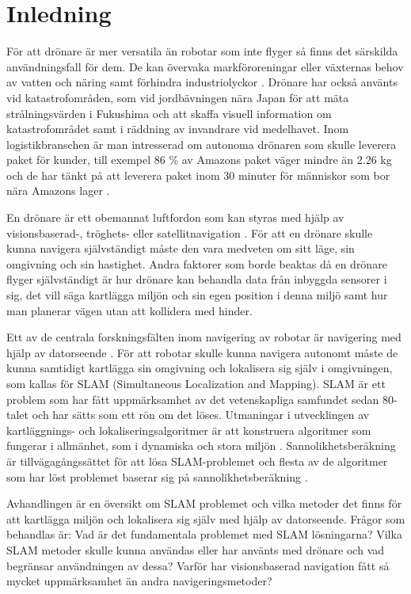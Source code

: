 \chapter{Inledning}

För att drönare är mer versatila än robotar som inte flyger så finns det särskilda användningsfall för dem. De kan övervaka markföroreningar eller växternas behov av vatten och näring samt förhindra industriolyckor \citep{crowdsurveillance}. Drönare har också använts vid katastrofområden, som vid jordbävningen nära Japan för att mäta strålningsvärden i Fukushima och att skaffa visuell information om katastrofområdet samt i räddning av invandrare vid medelhavet. Inom logistikbranschen är man intresserad om autonoma drönaren som skulle leverera paket för kunder, till exempel 86 \% av Amazons paket väger mindre än 2.26 kg och de har tänkt på att leverera paket inom 30 minuter för människor som bor nära Amazons lager \citep{cbsnews}.

En drönare är ett obemannat luftfordon som kan styras med hjälp av visionsbaserad-, tröghets- eller satellitnavigation \citep{geospatial}. För att en drönare skulle kunna navigera självständigt måste den vara medveten om sitt läge, sin omgivning och sin hastighet. Andra faktorer som borde beaktas då en drönare flyger självständigt är hur drönare kan behandla data från inbyggda sensorer i sig, det vill säga kartlägga miljön och sin egen position i denna miljö samt hur man planerar vägen utan att kollidera med hinder.

Ett av de centrala forskningsfälten inom navigering av robotar är navigering med hjälp av datorseende \citep{982903}. För att robotar skulle kunna navigera autonomt måste de kunna samtidigt kartlägga sin omgivning och lokalisera sig själv i omgivningen, som kallas för SLAM (Simultaneous Localization and Mapping). SLAM är ett problem som har fått uppmärksamhet av det vetenskapliga samfundet sedan 80-talet och har sätts som ett rön om det löses. Utmaningar i utvecklingen av kartläggnings- och lokaliseringsalgoritmer är att konstruera algoritmer som fungerar i allmänhet, som i dynamiska och stora miljön \citep{realslamproblem}. Sannolikhetsberäkning är tillvägagångssättet för att lösa SLAM-problemet och flesta av de algoritmer som har löst problemet baserar sig på sannolikhetsberäkning \citep{ProbabilisticRobotics}.

Avhandlingen är en översikt om SLAM problemet och vilka metoder det finns för att kartlägga miljön och lokalisera sig själv med hjälp av datorseende. Frågor som behandlas är: Vad är det fundamentala problemet med SLAM lösningarna? Vilka SLAM metoder skulle kunna användas eller har använts med drönare och vad begränsar användningen av dessa? Varför har visionsbaserad navigation fått så mycket uppmärksamhet än andra navigeringsmetoder?

